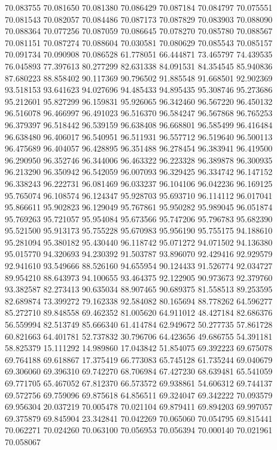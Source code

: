 70.083755
70.081650
70.081380
70.086429
70.087184
70.084797
70.075551
70.081543
70.082057
70.084486
70.087173
70.087829
70.083903
70.088090
70.088364
70.077256
70.087059
70.086645
70.078270
70.085780
70.088567
70.081151
70.087274
70.088604
70.030581
70.080629
70.085543
70.085157
70.091734
70.090908
70.086528
61.778051
66.444871
73.465797
74.439535
76.045893
77.397613
80.277299
82.631338
84.091531
84.354545
85.940836
87.680223
88.858402
90.117369
90.796502
91.885548
91.668501
92.902369
93.518153
93.641623
94.027696
94.485433
94.895435
95.308746
95.273686
95.212601
95.827299
96.159831
95.926065
96.342460
96.567220
96.450132
96.516078
96.466997
96.491023
96.516370
96.584247
96.567868
96.765253
96.379397
96.518442
96.539159
96.638408
96.668801
96.585499
96.416484
96.638480
96.406017
96.540951
96.511931
96.557712
96.519640
96.500113
96.475689
96.404057
96.428895
96.351488
96.278454
96.383941
96.419500
96.290950
96.352746
96.344006
96.463322
96.223328
96.389878
96.300935
96.213290
96.350942
96.542059
96.007093
96.329425
96.334742
96.147152
96.338243
96.222731
96.081469
96.033237
96.104106
96.042236
96.169125
95.765074
96.108574
96.124347
95.928703
95.693710
96.114112
96.017041
95.866611
95.902823
96.129049
95.767861
95.950282
95.989045
96.051874
95.769263
95.721057
95.954084
95.673566
95.747206
95.796783
95.682390
95.521500
95.913173
95.755228
95.670983
95.956190
95.755175
94.188610
95.281094
95.380182
95.430440
96.118742
95.071272
94.071502
94.136380
95.015770
94.320693
94.230392
91.503787
93.896070
92.429416
92.929579
92.941610
93.549666
88.526160
94.655954
90.124433
91.526774
92.034727
89.954210
88.643973
94.100655
93.464375
92.122905
90.973673
92.379760
93.382587
82.273413
90.635034
88.907465
90.689375
81.558513
89.253595
82.689874
73.399272
79.162338
92.584082
80.165694
88.778262
64.596277
85.272710
89.848558
69.462352
81.005620
64.911012
48.427184
82.686376
56.559994
82.513749
85.666340
61.414784
62.949672
50.277735
57.861728
60.821663
64.401781
52.737832
30.796706
64.423656
49.686755
54.391181
58.825379
15.111292
14.989860
17.043842
51.854075
69.392223
69.675078
69.764188
69.618867
17.375419
66.773083
65.745128
61.735244
69.040679
69.306060
69.396310
69.742270
68.706984
67.427230
68.639481
65.541059
69.771705
65.467052
67.812370
66.573572
69.938861
54.606312
69.744137
69.572756
69.759096
69.875618
64.856511
69.324047
69.342222
70.093579
69.956304
20.037219
70.005478
70.021104
69.879411
69.894203
69.997057
69.375879
69.845904
23.342841
70.042269
70.065060
70.054795
69.815441
70.062271
70.024260
70.063100
70.056953
70.056394
70.000140
70.021961
70.058067
